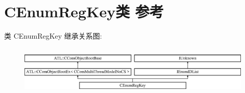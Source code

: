 \hypertarget{class_c_enum_reg_key}{}\section{C\+Enum\+Reg\+Key类 参考}
\label{class_c_enum_reg_key}
类 C\+Enum\+Reg\+Key 继承关系图\+:\begin{figure}[H]
\begin{center}
\leavevmode
\includegraphics[height=2.386364cm]{class_c_enum_reg_key}
\end{center}
\end{figure}
